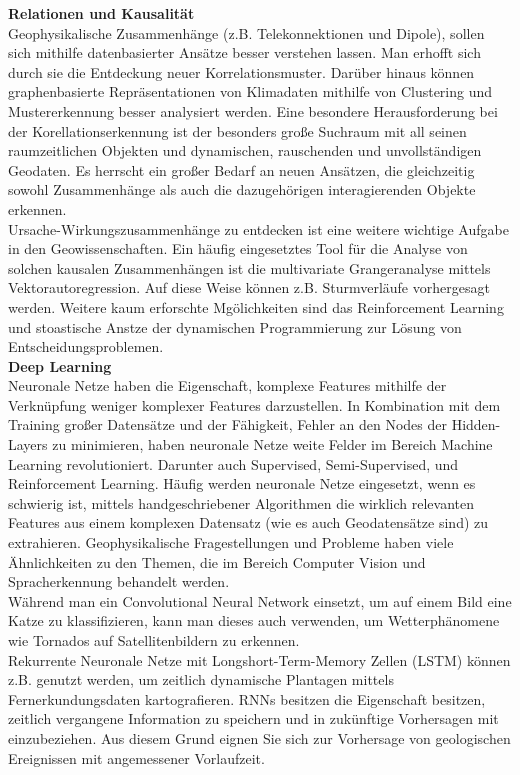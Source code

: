 \documentclass[11pt,ceqn]{book}
\begin{document}
\bigskip
\textbf{Relationen und Kausalität}\\
Geophysikalische Zusammenhänge (z.B. Telekonnektionen und Dipole), sollen sich mithilfe datenbasierter Ansätze besser verstehen lassen. Man erhofft sich durch sie die Entdeckung neuer Korrelationsmuster.
Darüber hinaus können graphenbasierte Repräsentationen von Klimadaten mithilfe von Clustering und Mustererkennung besser analysiert werden.
\bigskip
Eine besondere Herausforderung bei der Korellationserkennung ist der besonders große Suchraum mit all seinen raumzeitlichen Objekten und dynamischen, rauschenden und unvollständigen Geodaten. Es herrscht ein großer Bedarf an neuen Ansätzen, die gleichzeitig sowohl Zusammenhänge als auch die dazugehörigen interagierenden Objekte erkennen.\\
Ursache-Wirkungszusammenhänge zu entdecken ist eine weitere wichtige Aufgabe in den Geowissenschaften. Ein häufig eingesetztes Tool für die Analyse von solchen kausalen Zusammenhängen ist die multivariate Grangeranalyse mittels Vektorautoregression. Auf diese Weise können z.B. Sturmverläufe vorhergesagt werden. Weitere kaum erforschte Mgölichkeiten sind das Reinforcement Learning und stoastische Anstze der dynamischen Programmierung zur Lösung von Entscheidungsproblemen.
\\ \bigskip
\textbf{Deep Learning}\\
Neuronale Netze haben die Eigenschaft, komplexe Features mithilfe der Verknüpfung weniger komplexer Features darzustellen. In Kombination mit dem Training großer Datensätze und der Fähigkeit, Fehler an den Nodes der Hidden-Layers zu minimieren, haben neuronale Netze weite Felder im Bereich Machine Learning revolutioniert. Darunter auch  Supervised, Semi-Supervised, und Reinforcement Learning. Häufig werden neuronale Netze eingesetzt, wenn es schwierig ist, mittels handgeschriebener Algorithmen die wirklich relevanten Features aus einem komplexen Datensatz (wie es auch Geodatensätze sind) zu extrahieren. Geophysikalische Fragestellungen und Probleme haben viele Ähnlichkeiten zu den Themen, die im Bereich Computer Vision und Spracherkennung behandelt werden. \\
\bigskip
Während man ein Convolutional Neural Network einsetzt, um auf einem Bild eine Katze zu klassifizieren, kann man dieses auch verwenden, um Wetterphänomene wie Tornados auf Satellitenbildern zu erkennen. \\ \bigskip
Rekurrente Neuronale Netze mit Longshort-Term-Memory Zellen (LSTM) können z.B. genutzt werden, um zeitlich dynamische Plantagen mittels Fernerkundungsdaten kartografieren. RNNs besitzen die Eigenschaft besitzen, zeitlich vergangene Information zu speichern und in zukünftige Vorhersagen mit einzubeziehen. Aus diesem Grund eignen Sie sich zur Vorhersage von geologischen Ereignissen mit angemessener Vorlaufzeit.\\
\end{document}
